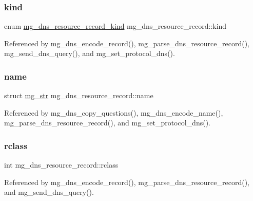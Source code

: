 \subsubsection{\texorpdfstring{kind}{kind}}
{\footnotesize\ttfamily enum \hyperlink{mongoose_8h_abc1e540c922be63eea4488f520e3523d_abc1e540c922be63eea4488f520e3523d}{mg\+\_\+dns\+\_\+resource\+\_\+record\+\_\+kind} mg\+\_\+dns\+\_\+resource\+\_\+record\+::kind}



Referenced by mg\+\_\+dns\+\_\+encode\+\_\+record(), mg\+\_\+parse\+\_\+dns\+\_\+resource\+\_\+record(), mg\+\_\+send\+\_\+dns\+\_\+query(), and mg\+\_\+set\+\_\+protocol\+\_\+dns().

\mbox{\label{structmg__dns__resource__record_afd27e187a02127a98a04757013aecd48_afd27e187a02127a98a04757013aecd48}} 
\subsubsection{\texorpdfstring{name}{name}}
{\footnotesize\ttfamily struct \hyperlink{structmg__str}{mg\+\_\+str} mg\+\_\+dns\+\_\+resource\+\_\+record\+::name}



Referenced by mg\+\_\+dns\+\_\+copy\+\_\+questions(), mg\+\_\+dns\+\_\+encode\+\_\+name(), mg\+\_\+parse\+\_\+dns\+\_\+resource\+\_\+record(), and mg\+\_\+set\+\_\+protocol\+\_\+dns().

\mbox{\label{structmg__dns__resource__record_a9be7dc2d7ef4e2dc20413289a55f6ff7_a9be7dc2d7ef4e2dc20413289a55f6ff7}} 
\subsubsection{\texorpdfstring{rclass}{rclass}}
{\footnotesize\ttfamily int mg\+\_\+dns\+\_\+resource\+\_\+record\+::rclass}



Referenced by mg\+\_\+dns\+\_\+encode\+\_\+record(), mg\+\_\+parse\+\_\+dns\+\_\+resource\+\_\+record(), and mg\+\_\+send\+\_\+dns\+\_\+query().


